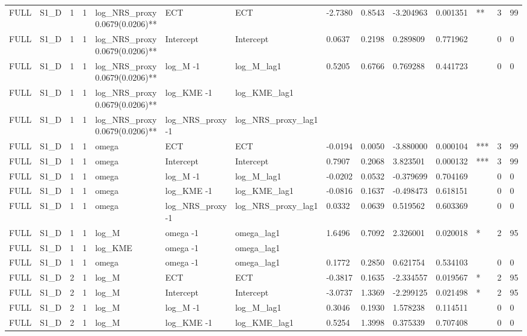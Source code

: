 \begin{tabular}{llllllllllllll}
FULL & S1\_D & 1 & 1 & log\_NRS\_proxy 0.0679(0.0206)** & ECT & ECT & -2.7380 & 0.8543 & -3.204963 & 0.001351 & ** & 3 & 99 \\
FULL & S1\_D & 1 & 1 & log\_NRS\_proxy 0.0679(0.0206)** & Intercept & Intercept & 0.0637 & 0.2198 & 0.289809 & 0.771962 &  & 0 & 0 \\
FULL & S1\_D & 1 & 1 & log\_NRS\_proxy 0.0679(0.0206)** & log\_M -1 & log\_M\_lag1 & 0.5205 & 0.6766 & 0.769288 & 0.441723 &  & 0 & 0 \\
FULL & S1\_D & 1 & 1 & log\_NRS\_proxy 0.0679(0.0206)** & log\_KME -1 & log\_KME\_lag1 &  &  &  &  &  &  &  \\
FULL & S1\_D & 1 & 1 & log\_NRS\_proxy 0.0679(0.0206)** & log\_NRS\_proxy -1 & log\_NRS\_proxy\_lag1 &  &  &  &  &  &  &  \\
FULL & S1\_D & 1 & 1 & omega & ECT & ECT & -0.0194 & 0.0050 & -3.880000 & 0.000104 & *** & 3 & 99 \\
FULL & S1\_D & 1 & 1 & omega & Intercept & Intercept & 0.7907 & 0.2068 & 3.823501 & 0.000132 & *** & 3 & 99 \\
FULL & S1\_D & 1 & 1 & omega & log\_M -1 & log\_M\_lag1 & -0.0202 & 0.0532 & -0.379699 & 0.704169 &  & 0 & 0 \\
FULL & S1\_D & 1 & 1 & omega & log\_KME -1 & log\_KME\_lag1 & -0.0816 & 0.1637 & -0.498473 & 0.618151 &  & 0 & 0 \\
FULL & S1\_D & 1 & 1 & omega & log\_NRS\_proxy -1 & log\_NRS\_proxy\_lag1 & 0.0332 & 0.0639 & 0.519562 & 0.603369 &  & 0 & 0 \\
FULL & S1\_D & 1 & 1 & log\_M & omega -1 & omega\_lag1 & 1.6496 & 0.7092 & 2.326001 & 0.020018 & * & 2 & 95 \\
FULL & S1\_D & 1 & 1 & log\_KME & omega -1 & omega\_lag1 &  &  &  &  &  &  &  \\
FULL & S1\_D & 1 & 1 & omega & omega -1 & omega\_lag1 & 0.1772 & 0.2850 & 0.621754 & 0.534103 &  & 0 & 0 \\
FULL & S1\_D & 2 & 1 & log\_M & ECT & ECT & -0.3817 & 0.1635 & -2.334557 & 0.019567 & * & 2 & 95 \\
FULL & S1\_D & 2 & 1 & log\_M & Intercept & Intercept & -3.0737 & 1.3369 & -2.299125 & 0.021498 & * & 2 & 95 \\
FULL & S1\_D & 2 & 1 & log\_M & log\_M -1 & log\_M\_lag1 & 0.3046 & 0.1930 & 1.578238 & 0.114511 &  & 0 & 0 \\
FULL & S1\_D & 2 & 1 & log\_M & log\_KME -1 & log\_KME\_lag1 & 0.5254 & 1.3998 & 0.375339 & 0.707408 &  & 0 & 0 \\

\end{tabular}
